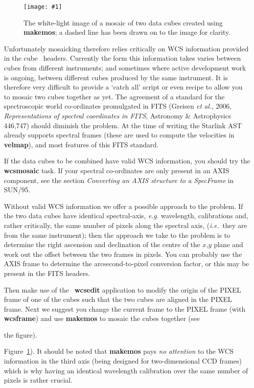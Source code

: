 \documentclass[twoside,11pt]{article}
\newcommand{\htmladdimg}[1]{}
\newcommand{\latex}[1]{#1}
\newcommand{\xref}[3]{#1}
\newcommand{\myfig} [5] {
  \begin{figure}[thb]
    \centering\texttt{[image: \#1]}
    \typeout{#1 inserted on page \arabic{page}}
    \caption{\label{#4}#5}
  \end{figure}
  }
\newcommand{\myfig}[5]{
    \label{#4} \htmladdimg{#3}\\
    Figure: #5\\
    }
\begin{document}
{\myfig{sc16_mosaic.eps}{height=0.5\textheight}{sc16_mosaic.gif}{sc16_mosaic_fig}{The
white-light image of a mosaic of two data cubes created using {\bf makemos};
a dashed line has been drawn on to the image for clarity.}

Unfortunately mosaicking therefore relies critically on WCS
information provided in the cube \FITSref\ headers.  Currently the
form this information takes varies between cubes from different
instruments; and sometimes where active development work is ongoing,
between different cubes produced by the same instrument.  It is
therefore very difficult to provide a `catch all' script or even
recipe to allow you to mosaic two cubes together as yet.  The
agreement of a standard for the spectroscopic world co-ordinates
promulgated in FITS (Greisen {\em et al.}, 2006, {\em Representations 
of spectral coordinates in FITS}, Astronomy \& Astrophysics 446,747)
should diminish the problem. At the time of writing the Starlink
\xref{AST}{sun210}{} already supports spectral frames (these are used
to compute the velocities in {\bf velmap}), and most features of this
FITS standard.

If the data cubes to be combined have valid WCS information,
you should try the \xref{{\bf wcsmosaic}}{sun95}{WCSMOSAIC} task.
If your spectral co-ordinates are only present in an AXIS component,
see the section \xref{{\em Converting an AXIS structure to a
SpecFrame}}{sun95}{se_wcsuse}{\latex{ in SUN/95}}.

Without valid WCS information we offer a possible approach to the
problem.  If the two data cubes have identical spectral-axis,
\emph{e.g.} wavelength, calibrations and, rather critically, the same
number of pixels along the spectral axis, (\emph{i.e.}\ they are from
the same instrument); then the approach we take to the problem is to
determine the right ascension and declination of the centre of the
$x$,$y$ plane and work out the offset between the two frames in
pixels.  You can probably use the AXIS frame to determine the
arcsecond-to-pixel conversion factor, or this may be present in the
FITS headers.

Then make use of the \CCDPACK\ \xref{{\bf wcsedit}}{sun139}{WCSEDIT}
application to modify the origin of the PIXEL frame of one of the
cubes such that the two cubes are aligned in the PIXEL frame.  Next
we suggest you change the current frame to the PIXEL frame (with 
\xref{{\bf wcsframe}}{sun95}{WCSFRAME}) and use
\xref{{\bf makemos}}{sun139}{MAKEMOS} to mosaic the cubes together (see
\begin{htmlonly}
the figure).
\end{htmlonly}
\latex{Figure~\ref{sc16_mosaic_fig}).}  It should be noted that {\bf makemos} pays
{\em no attention} to the WCS information in the third axis (being
designed for two-dimensional CCD frames) which is why having an
identical wavelength calibration over the same number of pixels is
rather crucial.

}
\end{document}
